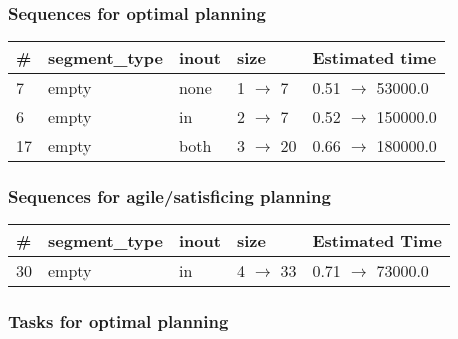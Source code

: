 \documentclass{article}
\begin{document}
                            \subsubsection*{Sequences for optimal planning}

                            \begin{center}
                            \begin{tabular}{@{}l|l|l|l|l@{}}
                            \# & segment\_type & inout & size & Estimated time\\\midrule
                            7&empty&none&1 $\rightarrow$ 7&0.51 $\rightarrow$ 53000.0\\
6&empty&in&2 $\rightarrow$ 7&0.52 $\rightarrow$ 150000.0\\
17&empty&both&3 $\rightarrow$ 20&0.66 $\rightarrow$ 180000.0
                            \end{tabular}
                            \end{center}
                    
                         \subsubsection*{Sequences for agile/satisficing planning}

                        \begin{center}
                        \begin{tabular}{@{}l|l|l|l|l@{}}
                        \# & segment\_type & inout & size & Estimated Time\\\midrule
                        30&empty&in&4 $\rightarrow$ 33&0.71 $\rightarrow$ 73000.0
                        \end{tabular}
                        \end{center}
                    
                                \subsubsection*{Tasks for optimal planning}
                                
\end{document}
